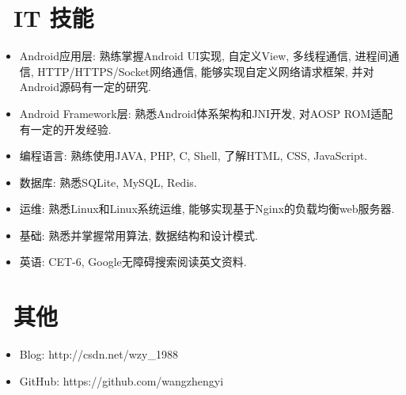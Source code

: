 \documentclass{resume}
\begin{document}
\section{\faCogs\ IT 技能}
\begin{itemize}[parsep=0.5ex]
  \item Android应用层: 熟练掌握Android UI实现, 自定义View, 多线程通信, 进程间通信, HTTP/HTTPS/Socket网络通信, 能够实现自定义网络请求框架, 并对Android源码有一定的研究.
  \item Android Framework层: 熟悉Android体系架构和JNI开发, 对AOSP ROM适配有一定的开发经验.
  \item 编程语言: 熟练使用JAVA, PHP, C, Shell, 了解HTML, CSS, JavaScript.
  \item 数据库: 熟悉SQLite, MySQL, Redis.
  \item 运维: 熟悉Linux和Linux系统运维, 能够实现基于Nginx的负载均衡web服务器.
  \item 基础: 熟悉并掌握常用算法, 数据结构和设计模式.
  \item 英语: CET-6, Google无障碍搜索阅读英文资料.
\end{itemize}

\section{\faInfo\ 其他}
\begin{itemize}[parsep=0.5ex]
  \item Blog: http://csdn.net/wzy\_1988
  \item GitHub: https://github.com/wangzhengyi
\end{itemize}

%
%
\end{document}
